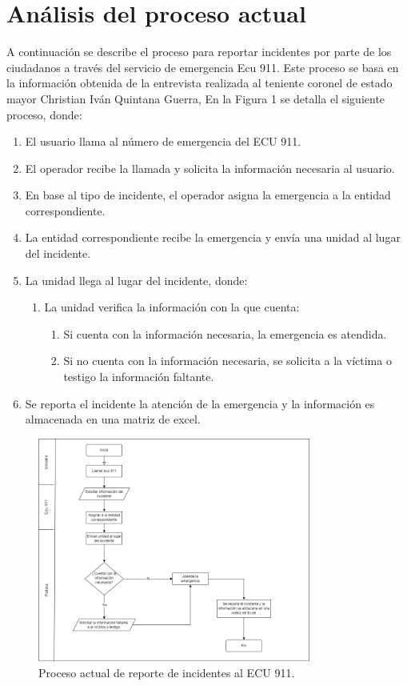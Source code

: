 \section{Análisis del proceso actual}
A continuación se describe el proceso para reportar incidentes por parte de los ciudadanos a través del servicio
de emergencia Ecu 911. Este proceso se basa en la información obtenida de la entrevista realizada al teniente
coronel de estado mayor Christian Iván Quintana Guerra, En la Figura 1 se detalla el siguiente proceso, donde:

\begin{enumerate}
    \item El usuario llama al número de emergencia del ECU 911.
    \item El operador recibe la llamada y solicita la información necesaria al usuario.
    \item En base al tipo de incidente, el operador asigna la emergencia a la entidad correspondiente.
    \item La entidad correspondiente recibe la emergencia y envía una unidad al lugar del incidente.
    \item La unidad llega al lugar del incidente, donde:
          \begin{enumerate}
              \item La unidad verifica la información con la que cuenta:
                    \begin{enumerate}
                        \item Si cuenta con la información necesaria, la emergencia es atendida.
                        \item Si no cuenta con la información necesaria, se solicita a la víctima o testigo la información faltante.
                    \end{enumerate}
          \end{enumerate}
    \item Se reporta el incidente la atención de la emergencia y la información es almacenada en una matriz de excel.
\end{enumerate}

\begin{figure}[H]
    \centering
    \includegraphics[width=0.8\textwidth]{chapters/III-resultados-y-discusion/resources/images/proceso-actual.png}
    \caption{Proceso actual de reporte de incidentes al ECU 911.}
    \label{fig:proceso-actual}
\end{figure}